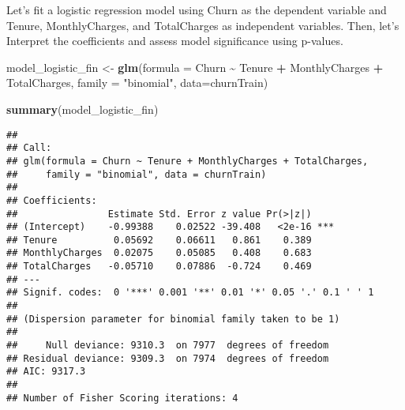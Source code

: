 \documentclass[
]{article}
\newenvironment{Shaded}{\begin{snugshade}}{\end{snugshade}}
\newcommand{\AttributeTok}[1]{\textcolor[rgb]{0.13,0.29,0.53}{#1}}
\newcommand{\DecValTok}[1]{\textcolor[rgb]{0.00,0.00,0.81}{#1}}
\newcommand{\FunctionTok}[1]{\textcolor[rgb]{0.13,0.29,0.53}{\textbf{#1}}}
\newcommand{\NormalTok}[1]{#1}
\newcommand{\OtherTok}[1]{\textcolor[rgb]{0.56,0.35,0.01}{#1}}
\newcommand{\SpecialCharTok}[1]{\textcolor[rgb]{0.81,0.36,0.00}{\textbf{#1}}}
\newcommand{\StringTok}[1]{\textcolor[rgb]{0.31,0.60,0.02}{#1}}
\begin{document}
Let's fit a logistic regression model using Churn as the dependent
variable and Tenure, MonthlyCharges, and TotalCharges as independent
variables. Then, let's Interpret the coefficients and assess model
significance using p-values.

\begin{Shaded}
\begin{Highlighting}[]
\NormalTok{model\_logistic\_fin }\OtherTok{\textless{}{-}} \FunctionTok{glm}\NormalTok{(}\AttributeTok{formula =}\NormalTok{ Churn }\SpecialCharTok{\textasciitilde{}}\NormalTok{ Tenure }\SpecialCharTok{+}\NormalTok{ MonthlyCharges }\SpecialCharTok{+}\NormalTok{ TotalCharges, }\AttributeTok{family =} \StringTok{"binomial"}\NormalTok{, }\AttributeTok{data=}\NormalTok{churnTrain)}

\FunctionTok{summary}\NormalTok{(model\_logistic\_fin)}
\end{Highlighting}
\end{Shaded}

\begin{verbatim}
## 
## Call:
## glm(formula = Churn ~ Tenure + MonthlyCharges + TotalCharges, 
##     family = "binomial", data = churnTrain)
## 
## Coefficients:
##                Estimate Std. Error z value Pr(>|z|)    
## (Intercept)    -0.99388    0.02522 -39.408   <2e-16 ***
## Tenure          0.05692    0.06611   0.861    0.389    
## MonthlyCharges  0.02075    0.05085   0.408    0.683    
## TotalCharges   -0.05710    0.07886  -0.724    0.469    
## ---
## Signif. codes:  0 '***' 0.001 '**' 0.01 '*' 0.05 '.' 0.1 ' ' 1
## 
## (Dispersion parameter for binomial family taken to be 1)
## 
##     Null deviance: 9310.3  on 7977  degrees of freedom
## Residual deviance: 9309.3  on 7974  degrees of freedom
## AIC: 9317.3
## 
## Number of Fisher Scoring iterations: 4
\end{verbatim}

\begin{Shaded}
\end{Shaded}
\end{document}
